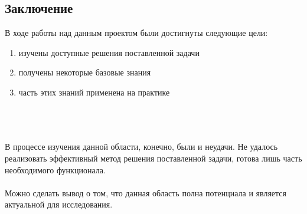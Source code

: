 \documentclass{article}
\begin{document}
    \newpage
    \begin{center} 
    \section{Заключение}
    \end{center}
    \large
    В ходе работы над данным проектом были достигнуты следующие цели:\\
    \begin{enumerate}
        \item изучены доступные решения поставленной задачи
        \item получены некоторые базовые знания
        \item часть этих знаний применена на практике
    \end{enumerate}
    \\ \\ \\
    В процессе изучения данной области, конечно, были и неудачи. Не удалось реализовать эффективный метод решения поставленной задачи, готова лишь часть необходимого функционала.
    \\ \\
    Можно сделать вывод о том, что данная область полна потенциала и является актуальной для исследования.
    
\end{document}

